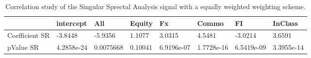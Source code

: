 \begin{table}[H]
\centering
\begin{tabular}{llllllll}
& intercept & All & Equity & Fx & Commo & FI & InClass \\ 
\hline 
Coefficient SR & -3.8448 & -5.9356 & 1.1077 & 3.0315 & 4.5481 & -3.0214 & 3.6591 \\ 
pValue SR & 4.2858e-24 & 0.0075668 & 0.10041 & 6.9196e-07 & 1.7728e-16 & 6.5419e-09 & 3.3955e-14 \\ 
\hline
\end{tabular}
\caption{Correlation study of the Singular Sprectal Analysis signal with a equally weighted weighting scheme.}
\label{SSA_EW_CORR}
\end{table}